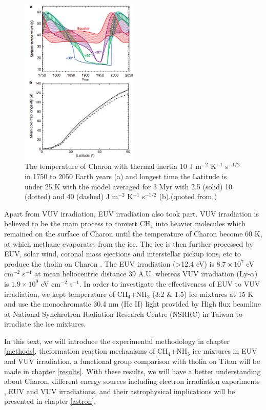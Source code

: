 \begin{figure}
\centering
\includegraphics[width=0.5\textwidth]{figures/chapter1/thermal.png}
\caption{The temperature of Charon with thermal inertia 10 J m$^{-2}$ K$^{-1}$ s$^{-1/2}$ in 1750 to 2050 Earth years (a) and longest time the Latitude is under 25 K with the model averaged for 3 Myr with 2.5 (solid) 10 (dotted) and 40 (dashed) J m$^{-2}$ K$^{-1}$ s$^{-1/2}$ (b).(quoted from \cite{grundy2016formation})}
\label{fig:Charon_thermal}
\end{figure}

Apart from VUV irradiation, EUV irradiation also took part. VUV irradiation is believed to be the main process to convert CH$_4$ into heavier molecules which remained on the surface of Charon until the temperature of Charon become 60 K, at which methane evaporates from the ice. The ice is then further processed by EUV, solar wind, coronal mass ejections and interstellar pickup ions, etc to produce the tholin on Charon \cite{grundy2016formation}. The EUV irradiation (>12.4 eV) is $8.7 \times 10^7$ eV cm$^{-2}$ s$^{-1}$ at mean heliocentric distance 39 A.U. whereas VUV irradiation (Ly-$\alpha$) is $1.9 \times 10^9$ eV cm$^{-2}$ s$^{-1}$\cite{grundy2016formation}. In order to investigate the effectiveness of EUV to VUV irradiation, we kept temperature of CH$_4$+NH$_3$ (3:2 \& 1:5) ice mixtures at 15 K and use the monochromatic 30.4 nm (He II) light provided by High flux beamline at National Synchrotron Radiation Research Centre (NSRRC) in Taiwan to irradiate the ice mixtures.

In this text, we will introduce the experimental methodology in chapter \ref{methods}, theformation reaction mechanisms of CH$_4$+NH$_3$ ice mixtures in EUV and VUV irradiation, a functional group comparison with tholin on Titan will be made in chapter \ref{results}. With these results, we will have a better understanding about Charon, different energy sources including electron irradiation experiments , EUV and VUV irradiations, and their astrophysical implications will be presented in chapter \ref{astron}.
